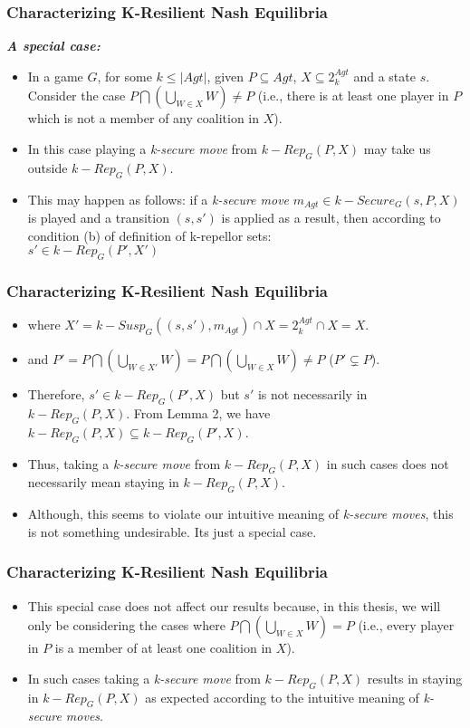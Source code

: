 \documentclass{beamer}
\begin{document}
\begin{frame}
\frametitle{Characterizing K-Resilient Nash Equilibria}
\textit{\textbf{A special case:}} 
\begin{itemize}
\item In a game $G$, for some $k \leq \vert Agt \vert$, given $P \subseteq Agt$, $X \subseteq 2^{Agt}_{k}$ and a state $s$. Consider the case $P \bigcap \left( \bigcup \limits_{W \in X}W \right) \neq P$ (i.e., there is at least one player in $P$ which is not a member of any coalition in $X$).
\item In this case playing a \textit{k-secure move} from $k-Rep_{G}(P, X)$ may take us outside $k-Rep_{G}(P, X)$.
\item This may happen as follows: if a \textit{k-secure move} $m_{Agt} \in k-Secure_{G}(s, P, X)$ is played and a transition $(s, s')$ is applied as a result, then according to condition (b) of definition of k-repellor sets:\\ $s' \in k-Rep_{G}(P', X')$
\end{itemize}
\end{frame}

\begin{frame}
\frametitle{Characterizing K-Resilient Nash Equilibria}
\begin{itemize}
\item where $X' = k-Susp_{G}((s, s'), m_{Agt}) \cap X = 2^{Agt}_{k} \cap X = X$.
\item and $P' = P \bigcap \left( \bigcup \limits_{W \in X'}W \right) = P \bigcap \left( \bigcup \limits_{W \in X}W \right) \neq P$ ($P' \subsetneq P$).
\item Therefore, $s' \in k-Rep_{G}(P', X)$ but $s'$ is not necessarily in $k-Rep_{G}(P, X)$. From Lemma 2, we have $k-Rep_{G}(P, X) \subseteq k-Rep_{G}(P', X)$.
\item Thus, taking a \textit{k-secure move} from $k-Rep_{G}(P, X)$ in such cases does not necessarily mean staying in $k-Rep_{G}(P, X)$.
\item Although, this seems to violate our intuitive meaning of \textit{k-secure moves}, this is not something undesirable. Its just a special case.
\end{itemize}
\end{frame}

\begin{frame}
\frametitle{Characterizing K-Resilient Nash Equilibria}
\begin{itemize}
\item This special case does not affect our results because, in this thesis, we will only be considering the cases where $P \bigcap \left( \bigcup \limits_{W \in X}W \right) = P$ (i.e., every player in $P$ is a member of at least one coalition in $X$).
\item In such cases taking a \textit{k-secure move} from $k-Rep_{G}(P, X)$ results in staying in $k-Rep_{G}(P, X)$ as expected according to the intuitive meaning of \textit{k-secure moves}.
\end{itemize}
\end{frame}
\end{document}
